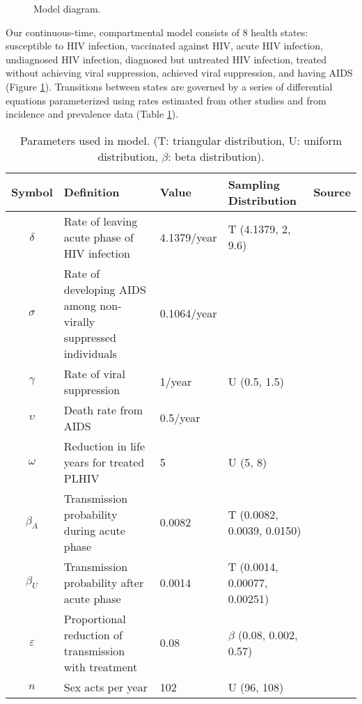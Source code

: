 \documentclass[11pt]{article}
\begin{document}
\begin{figure}
  \centering
  
  \caption{Model diagram.}
  \label{model_diag}
\end{figure}

Our continuous-time, compartmental model consists of 8 health states:
susceptible to HIV infection, vaccinated against HIV, acute HIV
infection, undiagnosed HIV infection, diagnosed but untreated HIV
infection, treated without achieving viral suppression, achieved viral
suppression, and having AIDS (Figure \ref{model_diag}). Transitions
between states are governed by a series of differential equations
parameterized using rates estimated from other studies and from
incidence and prevalence data (Table \ref{model_param}).


\begin{table}
  \begin{center}
    \begin{tabular}{cp{4cm}llc}
      \hline
      Symbol & Definition & Value & Sampling Distribution & Source \\ \hline
      $\delta$	& Rate of leaving acute phase of HIV infection & 4.1379/year & T (4.1379, 2, 9.6) & \cite{Hollingsworth2008-iy} \\
      $\sigma$	& Rate of developing AIDS among non-virally suppressed individuals
                          & 0.1064/year & & \cite{Morgan2002-cq} \\
      $\gamma$ & Rate of viral suppression & 1/year & U (0.5, 1.5) & \cite{Currie2009-yz} \\
      $\upsilon$	& Death rate from AIDS & 0.5/year &  & \cite{Morgan2002-cq} \\
      $\omega$	& Reduction in life years for treated PLHIV & 5 & U (5, 8) & \cite{Unaids2014-ue, Samji2013-kf}\\
      $\beta_{A}$	& Transmission probability during acute phase & 0.0082 & T (0.0082, 0.0039, 0.0150) & \cite{Skarbinski2015-ni,Wawer2005-us}\\
      $\beta_{U}$	& Transmission probability after acute phase & 0.0014 & T (0.0014, 0.00077, 0.00251) & \cite{Hughes2012-so}\\
      $\varepsilon$	& Proportional reduction of transmission with treatment & 0.08 & $\beta$ (0.08, 0.002, 0.57)& \cite{Donnell2010-xo}\\
      $n$			& Sex acts per year & 102 & U (96, 108) & \cite{Wawer2005-us,Abdool_Karim2010-cm}\\ \hline
    \end{tabular}
    \caption{Parameters used in model. (T: triangular distribution, U:
      uniform distribution, $\beta$: beta distribution).}
    \label{model_param}
  \end{center}
\end{table}
\end{document}
